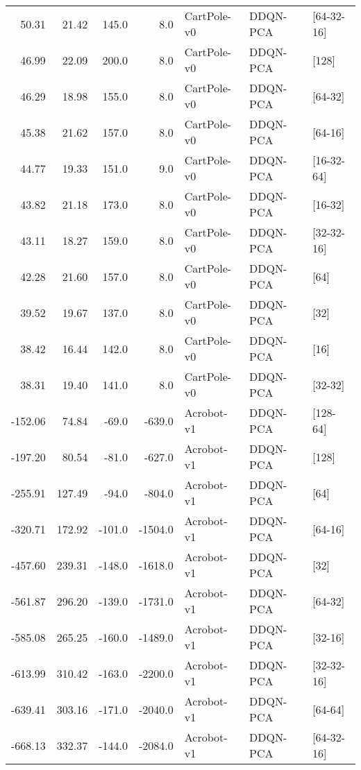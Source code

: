 \begin{tabular}{rrrrlll}
  50.31 &   21.42 &  145.0 &     8.0 &     CartPole-v0 &  DDQN-PCA &       [64-32-16] \\
  46.99 &   22.09 &  200.0 &     8.0 &     CartPole-v0 &  DDQN-PCA &            [128] \\
  46.29 &   18.98 &  155.0 &     8.0 &     CartPole-v0 &  DDQN-PCA &          [64-32] \\
  45.38 &   21.62 &  157.0 &     8.0 &     CartPole-v0 &  DDQN-PCA &          [64-16] \\
  44.77 &   19.33 &  151.0 &     9.0 &     CartPole-v0 &  DDQN-PCA &       [16-32-64] \\
  43.82 &   21.18 &  173.0 &     8.0 &     CartPole-v0 &  DDQN-PCA &          [16-32] \\
  43.11 &   18.27 &  159.0 &     8.0 &     CartPole-v0 &  DDQN-PCA &       [32-32-16] \\
  42.28 &   21.60 &  157.0 &     8.0 &     CartPole-v0 &  DDQN-PCA &             [64] \\
  39.52 &   19.67 &  137.0 &     8.0 &     CartPole-v0 &  DDQN-PCA &             [32] \\
  38.42 &   16.44 &  142.0 &     8.0 &     CartPole-v0 &  DDQN-PCA &             [16] \\
  38.31 &   19.40 &  141.0 &     8.0 &     CartPole-v0 &  DDQN-PCA &          [32-32] \\
-152.06 &   74.84 &  -69.0 &  -639.0 &      Acrobot-v1 &  DDQN-PCA &         [128-64] \\
-197.20 &   80.54 &  -81.0 &  -627.0 &      Acrobot-v1 &  DDQN-PCA &            [128] \\
-255.91 &  127.49 &  -94.0 &  -804.0 &      Acrobot-v1 &  DDQN-PCA &             [64] \\
-320.71 &  172.92 & -101.0 & -1504.0 &      Acrobot-v1 &  DDQN-PCA &          [64-16] \\
-457.60 &  239.31 & -148.0 & -1618.0 &      Acrobot-v1 &  DDQN-PCA &             [32] \\
-561.87 &  296.20 & -139.0 & -1731.0 &      Acrobot-v1 &  DDQN-PCA &          [64-32] \\
-585.08 &  265.25 & -160.0 & -1489.0 &      Acrobot-v1 &  DDQN-PCA &          [32-16] \\
-613.99 &  310.42 & -163.0 & -2200.0 &      Acrobot-v1 &  DDQN-PCA &       [32-32-16] \\
-639.41 &  303.16 & -171.0 & -2040.0 &      Acrobot-v1 &  DDQN-PCA &          [64-64] \\
-668.13 &  332.37 & -144.0 & -2084.0 &      Acrobot-v1 &  DDQN-PCA &       [64-32-16] \\

\end{tabular}
